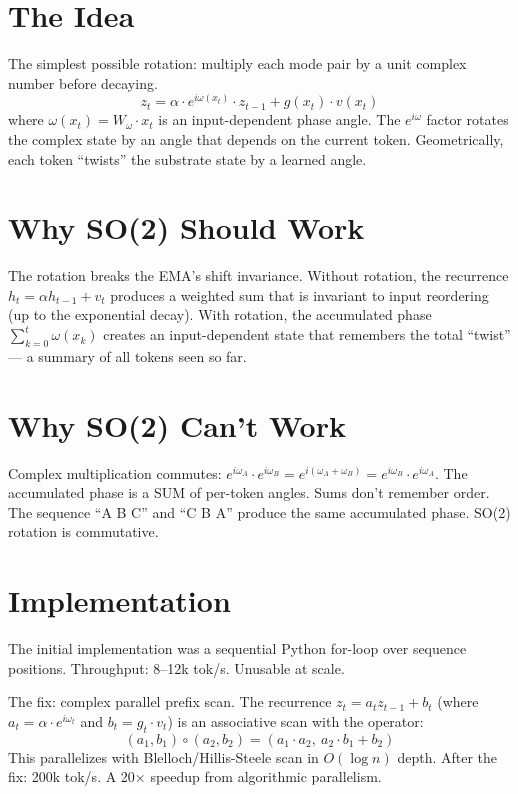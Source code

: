 \documentclass[11pt,a4paper]{report}
\begin{document}
\section{The Idea}

The simplest possible rotation: multiply each mode pair by a unit complex number before decaying.
\[
z_t = \alpha \cdot e^{i\omega(x_t)} \cdot z_{t-1} + g(x_t) \cdot v(x_t)
\]
where $\omega(x_t) = W_\omega \cdot x_t$ is an input-dependent phase angle. The $e^{i\omega}$ factor rotates the complex state by an angle that depends on the current token. Geometrically, each token ``twists'' the substrate state by a learned angle.

\section{Why SO(2) Should Work}

The rotation breaks the EMA's shift invariance. Without rotation, the recurrence $h_t = \alpha h_{t-1} + v_t$ produces a weighted sum that is invariant to input reordering (up to the exponential decay). With rotation, the accumulated phase $\sum_{k=0}^{t} \omega(x_k)$ creates an input-dependent state that remembers the total ``twist'' --- a summary of all tokens seen so far.

\section{Why SO(2) Can't Work}

Complex multiplication commutes: $e^{i\omega_A} \cdot e^{i\omega_B} = e^{i(\omega_A + \omega_B)} = e^{i\omega_B} \cdot e^{i\omega_A}$. The accumulated phase is a SUM of per-token angles. Sums don't remember order. The sequence ``A B C'' and ``C B A'' produce the same accumulated phase. SO(2) rotation is commutative.

\section{Implementation}

The initial implementation was a sequential Python for-loop over sequence positions. Throughput: 8--12k tok/s. Unusable at scale.

The fix: complex parallel prefix scan. The recurrence $z_t = a_t z_{t-1} + b_t$ (where $a_t = \alpha \cdot e^{i\omega_t}$ and $b_t = g_t \cdot v_t$) is an associative scan with the operator:
\[
(a_1, b_1) \circ (a_2, b_2) = (a_1 \cdot a_2,\ a_2 \cdot b_1 + b_2)
\]
This parallelizes with Blelloch/Hillis-Steele scan in $O(\log n)$ depth. After the fix: 200k tok/s. A 20$\times$ speedup from algorithmic parallelism.
\end{document}
